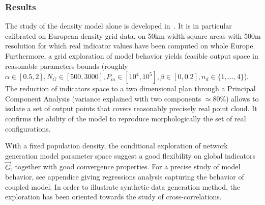 \documentclass{bmcart}
\begin{document}
\subsubsection*{Results}

The study of the density model alone is developed in~\cite{raimbault2018calibration}. It is in particular calibrated on European density grid data, on 50km width square areas with 500m resolution for which real indicator values have been computed on whole Europe. Furthermore, a grid exploration of model behavior yields feasible output space in reasonable parameters bounds (roughly $\alpha \in [0.5,2],N_G\in [500,3000], P_m \in [10^4,10^5],\beta\in [0,0.2], n_d \in \{ 1, \ldots , 4\}$). The reduction of indicators space to a two dimensional plan through a Principal Component Analysis (variance explained with two components $\simeq 80\%$) allows to isolate a set of output points that covers reasonably precisely real point cloud. It confirms the ability of the model to reproduce morphologically the set of real configurations.



With a fixed population density, the conditional exploration of network generation model parameter space suggest a good flexibility on global indicators $\vec{G}$, together with good convergence properties. For a precise study of model behavior, see appendice giving regressions analysis capturing the behavior of coupled model. In order to illustrate synthetic data generation method, the exploration has been oriented towards the study of cross-correlations.
\end{document}
